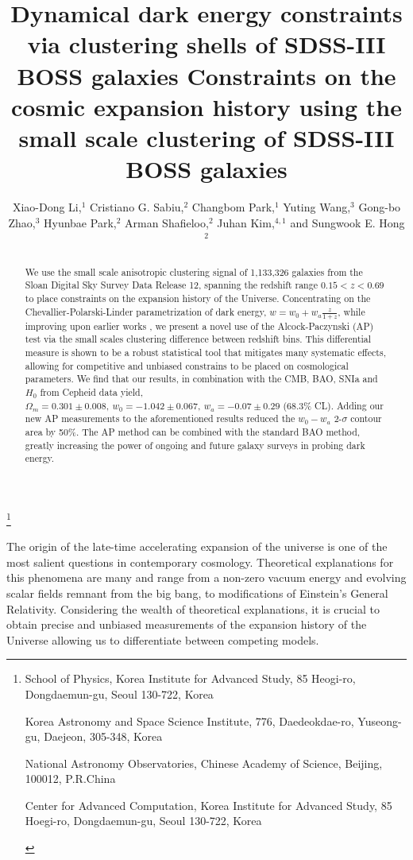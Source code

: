 \documentclass{natureprintstyle}
\title{%
Dynamical dark energy constraints via clustering shells of SDSS-III BOSS galaxies}
\title{%
Constraints on the cosmic expansion history using the small scale clustering of SDSS-III BOSS galaxies}
\author{%
Xiao-Dong Li,$^{1}$
Cristiano G. Sabiu,$^{2}$
Changbom Park,$^{1}$
Yuting Wang,$^{3}$
Gong-bo Zhao,$^{3}$
Hyunbae Park,$^{2}$
Arman Shafieloo,$^{2}$
Juhan Kim,$^{4,1}$
and Sungwook E. Hong$^{2}$}
\let\citep\cite
\begin{document}
\maketitle
\let\thefootnote\relax\footnote{


\begin{affiliations}
  \item School of Physics, Korea Institute for Advanced Study, 85 Heogi-ro, Dongdaemun-gu, Seoul 130-722, Korea
  \item Korea Astronomy and Space Science Institute, 776, Daedeokdae-ro, Yuseong-gu, Daejeon, 305-348, Korea
  \item National Astronomy Observatories, Chinese Academy of Science, Beijing, 100012, P.R.China
  \item Center for Advanced Computation, Korea Institute for Advanced Study, 85 Hoegi-ro, Dongdaemun-gu, Seoul 130-722, Korea
\end{affiliations}
}

\vspace{-3.5mm}
\begin{abstract}
We use the small scale anisotropic clustering signal of 1,133,326 galaxies from the Sloan Digital Sky Survey Data Release 
12, spanning the redshift range $0.15<z<0.69$ to place constraints on the expansion history of the Universe. 
Concentrating on the Chevallier-Polarski-Linder parametrization of dark energy, $w=w_0+w_a\frac{z}{1+z}$,
while improving upon earlier works \citep{Li2016}, 
we present a novel use of the Alcock-Paczynski (AP) test via the small scales clustering difference between redshift bins. 
This differential measure is shown to be a robust statistical tool that mitigates many systematic effects, 
allowing for competitive and unbiased constrains to be placed on cosmological parameters.
We find that our results, in combination with the CMB, BAO, SNIa and $H_0$ from Cepheid data yield, 
$\Omega_m = 0.301 \pm 0.008,\ w_0 = -1.042 \pm 0.067,\ w_a = -0.07 \pm 0.29$ (68.3\% CL). 
Adding our new AP measurements to the aforementioned results reduced the $w_0-w_a$ 2-$\sigma$ contour area by 50\%.
The AP method can be combined with the standard BAO method, 
greatly increasing the power of ongoing and future galaxy surveys in probing dark energy.
\end{abstract}

The  origin  of  the late-time accelerating  expansion  of  the  universe  is  one of  the  most  salient  questions  in  contemporary cosmology. Theoretical explanations for this phenomena are many and range from a non-zero  vacuum energy and evolving  scalar  fields  remnant  from  the  big  bang, to modifications of Einstein's General Relativity\cite{2012IJMPD..2130002Y}. 
Considering the wealth of theoretical explanations, it is crucial to obtain precise and unbiased measurements of the expansion history of the Universe allowing us to 
differentiate between competing models. 
\end{document}
